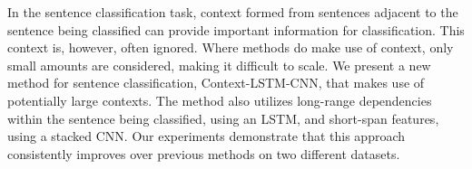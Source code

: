 In the sentence classification task, context formed from sentences adjacent to the sentence being classified can provide important information for classification. This context is, however, often ignored. Where methods do make use of context, only small amounts are considered, making it difficult to scale. We present a new method for sentence classification, Context-LSTM-CNN, that makes use of potentially large contexts. The method also utilizes long-range dependencies within the sentence being classified, using an LSTM, and short-span features, using a stacked CNN. Our experiments demonstrate that this approach consistently improves over previous methods on two different datasets.
